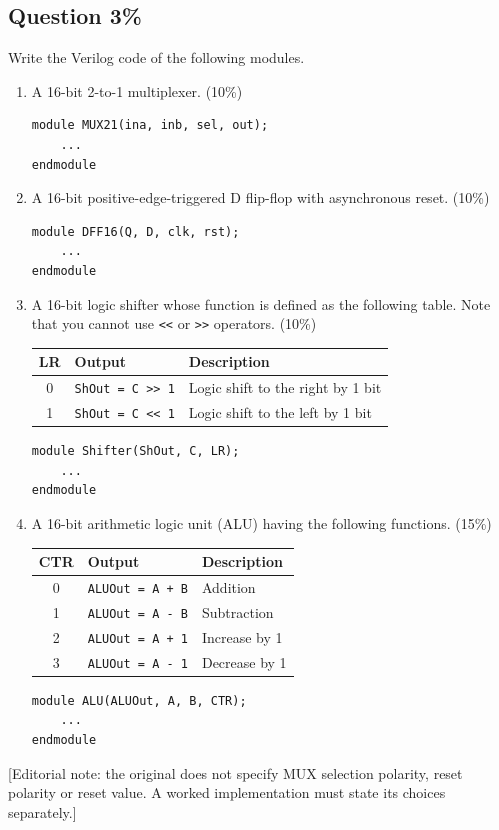 \documentclass[11pt,a4paper]{article}
\newcommand{\question}[2]{\subsection*{Question #1\hfill\normalfont #2}}
\begin{document}
\newpage
\question{3}{45\%}
Write the Verilog code of the following modules.
\begin{enumerate}[label=(\alph*)]
\item A 16-bit 2-to-1 multiplexer. (10\%)
\begin{lstlisting}
module MUX21(ina, inb, sel, out);
    ...
endmodule
\end{lstlisting}

\item A 16-bit positive-edge-triggered D flip-flop with asynchronous reset.
(10\%)
\begin{lstlisting}
module DFF16(Q, D, clk, rst);
    ...
endmodule
\end{lstlisting}

\item A 16-bit logic shifter whose function is defined as the following
table. Note that you cannot use \texttt{<<} or \texttt{>>} operators. (10\%)
\begin{center}
\begin{tabular}{c l l}
\toprule
LR & Output & Description\\
\midrule
0 & \texttt{ShOut = C >> 1} & Logic shift to the right by 1 bit\\
1 & \texttt{ShOut = C << 1} & Logic shift to the left by 1 bit\\
\bottomrule
\end{tabular}
\end{center}
\begin{lstlisting}
module Shifter(ShOut, C, LR);
    ...
endmodule
\end{lstlisting}

\item A 16-bit arithmetic logic unit (ALU) having the following functions.
(15\%)
\begin{center}
\begin{tabular}{c l l}
\toprule
CTR & Output & Description\\
\midrule
0 & \texttt{ALUOut = A + B} & Addition\\
1 & \texttt{ALUOut = A - B} & Subtraction\\
2 & \texttt{ALUOut = A + 1} & Increase by 1\\
3 & \texttt{ALUOut = A - 1} & Decrease by 1\\
\bottomrule
\end{tabular}
\end{center}
\begin{lstlisting}
module ALU(ALUOut, A, B, CTR);
    ...
endmodule
\end{lstlisting}
\end{enumerate}
{\small [Editorial note: the original does not specify MUX selection polarity,
reset polarity or reset value. A worked implementation must state its choices
separately.]}
\end{document}
